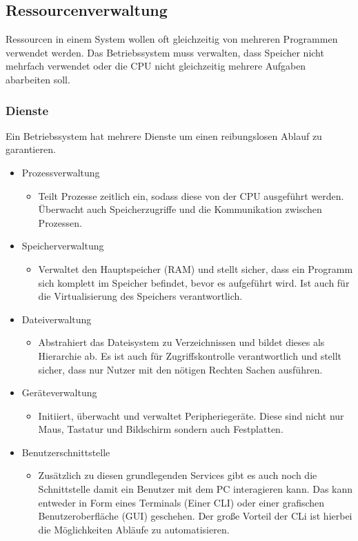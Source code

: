 \documentclass{article}
\begin{document}
	\subsection{Ressourcenverwaltung}
	Ressourcen in einem System wollen oft gleichzeitig von mehreren Programmen verwendet werden. Das Betriebssystem muss verwalten, dass Speicher nicht mehrfach verwendet oder die CPU nicht gleichzeitig mehrere Aufgaben abarbeiten soll. \\
	\subsubsection{Dienste}
	Ein Betriebssystem hat mehrere Dienste um einen reibungslosen Ablauf zu garantieren. \\
	\begin{itemize}
		\item{Prozessverwaltung}
		\begin{itemize}
			\item{Teilt Prozesse zeitlich ein, sodass diese von der CPU ausgeführt werden. Überwacht auch Speicherzugriffe und die Kommunikation zwischen Prozessen.}
		\end{itemize}
		\item{Speicherverwaltung}
		\begin{itemize}
			\item{Verwaltet den Hauptspeicher (RAM) und stellt sicher, dass ein Programm sich komplett im Speicher befindet, bevor es aufgeführt wird. Ist auch für die Virtualisierung des Speichers verantwortlich.}
		\end{itemize}
		\item{Dateiverwaltung}
		\begin{itemize}
			\item{Abstrahiert das Dateisystem zu Verzeichnissen und bildet dieses als Hierarchie ab. Es ist auch für Zugriffskontrolle verantwortlich und stellt sicher, dass nur Nutzer mit den nötigen Rechten Sachen ausführen.}
		\end{itemize}
		\item{Geräteverwaltung}
		\begin{itemize}
			\item{Initiiert, überwacht und verwaltet Peripheriegeräte. Diese sind nicht nur Maus, Tastatur und Bildschirm sondern auch Festplatten.}
		\end{itemize}
		\item{Benutzerschnittstelle}
		\begin{itemize}
			\item{Zusätzlich zu diesen grundlegenden Services gibt es auch noch die Schnittstelle damit ein Benutzer mit dem PC interagieren kann. Das kann entweder in Form eines Terminals (Einer CLI) oder einer grafischen Benutzeroberfläche (GUI) geschehen. Der große Vorteil der CLi ist hierbei die Möglichkeiten Abläufe zu automatisieren.}
		\end{itemize}
	\end{itemize}
\end{document}
